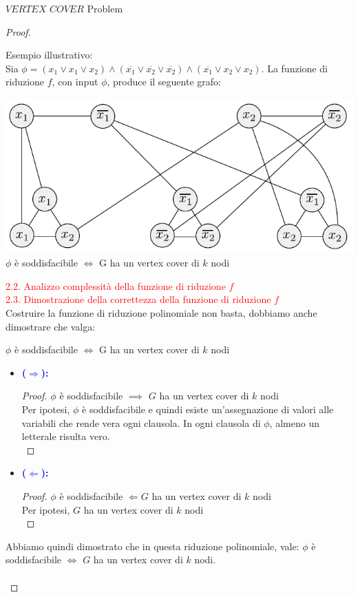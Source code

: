 \documentclass{article}  %
\theoremstyle{definition}
\begin{document}
\begin{theorem}{$VERTEX$ $COVER$ Problem}
\begin{proof}
\begin{itemize}
		\end{itemize}
		Esempio illustrativo: \\
		Sia $\phi = (x_1 \lor x_1 \lor x_2) \land (\overline{x_1} \lor \overline{x_2} \lor \overline{x_2}) \land (\overline{x_1} \lor x_2 \lor x_2)$. La funzione di riduzione $f$, con input $\phi$,
		produce il seguente grafo:
		\begin{center}
			\includegraphics[width=0.7\linewidth]{vertex-cover-ex.png} \\
			$\phi$ è soddisfacibile $\iff$ G ha un vertex cover di $k$ nodi
		\end{center}
		\textcolor{red}{2.2. Analizzo complessità della funzione di riduzione $f$} \\

		\textcolor{red}{2.3. Dimostrazione della correttezza della funzione di riduzione $f$} \\
		Costruire la funzione di riduzione polinomiale non basta, dobbiamo anche dimostrare che valga:
		\begin{center}
			$\phi$ è soddisfacibile $\iff$ G ha un vertex cover di $k$ nodi
		\end{center}
		\begin{itemize}
			\item \textcolor{blue}{\textbf{($\Longrightarrow$):}}
			      \begin{proof}
				      $\phi$ è soddisfacibile $\implies$ $G$ ha un vertex cover di $k$ nodi \\
				      Per ipotesi, $\phi$ è soddisfacibile e quindi esiste un'assegnazione di valori
				      alle variabili che rende vera ogni clausola.
				      In ogni clausola di $\phi$, almeno un letterale risulta vero. \\
				      
			      \end{proof}
			\item \textcolor{blue}{\textbf{($\Longleftarrow$):}}
			      \begin{proof}
				      $\phi$ è soddisfacibile $\Longleftarrow G$ ha un vertex cover di $k$ nodi \\
				      Per ipotesi, $G$ ha un vertex cover di $k$ nodi \\
			      \end{proof}
		\end{itemize}
		Abbiamo quindi dimostrato che in questa riduzione polinomiale, vale:
		$\phi$ è soddisfacibile $\iff$ $G$ ha un vertex cover di $k$ nodi. \\ \\


\end{proof}
\end{theorem}
\end{document}
